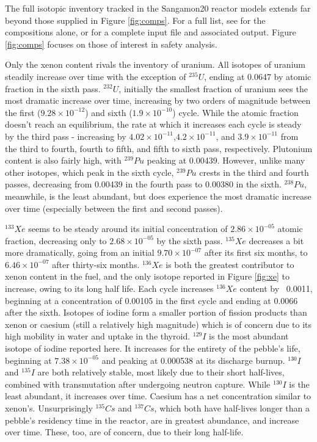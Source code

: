 

The full isotopic inventory tracked in the Sangamon20 reactor models extends far beyond those supplied in Figure \ref{fig:comps}.  For a full list, see \cite{richter_isotopic_2021} for the compositions alone, or \cite{richter_zoerichterphlox_2021} for a complete input file and associated output.  Figure \ref{fig:comps} focuses on those of interest in safety analysis.

Only the xenon content rivals the inventory of uranium.  All isotopes of uranium steadily increase over time with the exception of $^{235}U$, ending at 0.0647 by atomic fraction in the sixth pass.  $^{232}U$, initially the smallest fraction of uranium sees the most dramatic increase over time, increasing by two orders of magnitude between the first ($9.28\times10^{-12}$) and sixth ($1.9\times10^{-10}$) cycle.  While the atomic fraction doesn't reach an equilibrium, the rate at which it increases each cycle is steady by the third pass - increasing by $4.02\times10^{-11}$,$4.2\times10^{-11}$, and $3.9\times10^{-11}$ from the third to fourth, fourth to fifth, and fifth to sixth pass, respectively.  Plutonium content is also fairly high, with $^{239}Pu$ peaking at 0.00439.  However, unlike many other isotopes, which peak in the sixth cycle, $^{239}Pu$ crests in the third and fourth passes, decreasing from 0.00439 in the fourth pass to 0.00380 in the sixth.  $^238Pu$, meanwhile, is the least abundant, but does experience the most dramatic increase over time (especially between the first and second passes).



$^{133}Xe$ seems to be steady around its initial concentration of $2.86\times10^{-05}$ atomic fraction, decreasing only to $2.68\times10^{-05}$ by the sixth pass.  $^{135}Xe$ decreases a bit more dramatically, going from an initial $9.70\times10^{-07}$ after its first six months, to  $6.46\times10^{-07}$ after thirty-six months.  $^{136}Xe$ is both the greatest contributor to xenon content in the fuel, and the only isotope reported in  Figure \ref{fig:xe} to increase, owing to its long half life.  Each cycle increases $^{136}Xe$ content by ~0.0011, beginning at a concentration of 0.00105 in the first cycle and ending at 0.0066 after the sixth.  Isotopes of iodine form a smaller portion of fission products than xenon or caesium (still a relatively high magnitude) which is of concern due to its high mobility in water and uptake in the thyroid.  $^{129}I$ is the most abundant isotope of iodine reported here.  It increases for the entirety of the pebble's life, beginning at $7.38\times10^{-05}$ and peaking at 0.000538 at its discharge burnup.  $^{130}I$ and $^{135}I$ are both relatively stable, most likely due to their short half-lives, combined with transmutation after undergoing neutron capture.  While $^{130}I$ is the least abundant, it increases over time.  Caesium has a net concentration similar to xenon's.  Unsurprisingly $^{135}Cs$ and $^{137}Cs$, which both have half-lives longer than a pebble's residency time in the reactor, are in greatest abundance, and increase over time.  These, too, are of concern, due to their long half-life.

